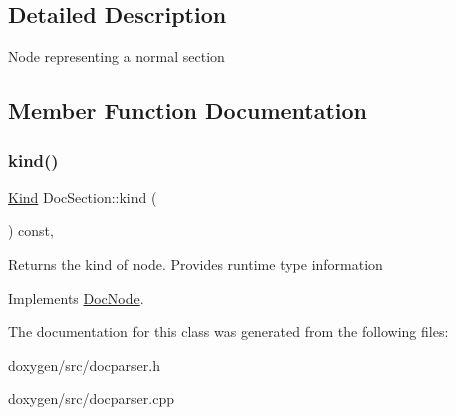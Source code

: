 \subsection{Detailed Description}
Node representing a normal section 

\subsection{Member Function Documentation}
\mbox{\label{class_doc_section_a38453b63370b56069f21b249a7f6f0ba}} 
\subsubsection{\texorpdfstring{kind()}{kind()}}
{\footnotesize\ttfamily \mbox{\hyperlink{class_doc_node_aebd16e89ca590d84cbd40543ea5faadb}{Kind}} Doc\+Section\+::kind (\begin{DoxyParamCaption}{ }\end{DoxyParamCaption}) const\hspace{0.3cm}{\ttfamily [inline]}, {\ttfamily [virtual]}}

Returns the kind of node. Provides runtime type information 

Implements \mbox{\hyperlink{class_doc_node_a108ffd214a72ba6e93dac084a8f58049}{Doc\+Node}}.



The documentation for this class was generated from the following files\+:\begin{DoxyCompactItemize}
\item 
doxygen/src/docparser.\+h\item 
doxygen/src/docparser.\+cpp\end{DoxyCompactItemize}
